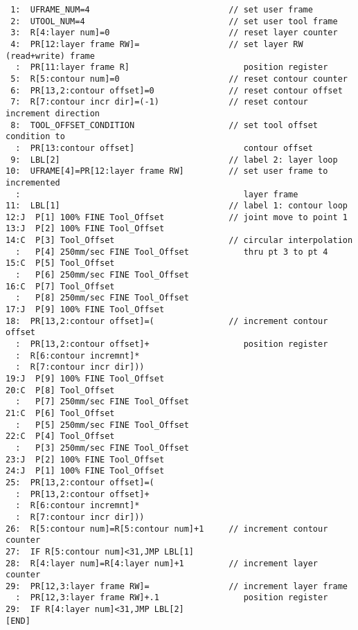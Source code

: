 \begin{verbatim}
 1:  UFRAME_NUM=4                            // set user frame
 2:  UTOOL_NUM=4                             // set user tool frame
 3:  R[4:layer num]=0                        // reset layer counter
 4:  PR[12:layer frame RW]=                  // set layer RW (read+write) frame 
  :  PR[11:layer frame R]                       position register   
 5:  R[5:contour num]=0                      // reset contour counter
 6:  PR[13,2:contour offset]=0               // reset contour offset
 7:  R[7:contour incr dir]=(-1)              // reset contour increment direction
 8:  TOOL_OFFSET_CONDITION                   // set tool offset condition to  
  :  PR[13:contour offset]                      contour offset
 9:  LBL[2]                                  // label 2: layer loop
10:  UFRAME[4]=PR[12:layer frame RW]         // set user frame to incremented 
  :                                             layer frame
11:  LBL[1]                                  // label 1: contour loop
12:J  P[1] 100% FINE Tool_Offset             // joint move to point 1
13:J  P[2] 100% FINE Tool_Offset
14:C  P[3] Tool_Offset                       // circular interpolation 
  :   P[4] 250mm/sec FINE Tool_Offset           thru pt 3 to pt 4
15:C  P[5] Tool_Offset
  :   P[6] 250mm/sec FINE Tool_Offset
16:C  P[7] Tool_Offset
  :   P[8] 250mm/sec FINE Tool_Offset
17:J  P[9] 100% FINE Tool_Offset
18:  PR[13,2:contour offset]=(               // increment contour offset 
  :  PR[13,2:contour offset]+                   position register
  :  R[6:contour incremnt]*
  :  R[7:contour incr dir]))
19:J  P[9] 100% FINE Tool_Offset
20:C  P[8] Tool_Offset
  :   P[7] 250mm/sec FINE Tool_Offset
21:C  P[6] Tool_Offset
  :   P[5] 250mm/sec FINE Tool_Offset
22:C  P[4] Tool_Offset
  :   P[3] 250mm/sec FINE Tool_Offset
23:J  P[2] 100% FINE Tool_Offset
24:J  P[1] 100% FINE Tool_Offset
25:  PR[13,2:contour offset]=(
  :  PR[13,2:contour offset]+
  :  R[6:contour incremnt]*
  :  R[7:contour incr dir]))
26:  R[5:contour num]=R[5:contour num]+1     // increment contour counter
27:  IF R[5:contour num]<31,JMP LBL[1]
28:  R[4:layer num]=R[4:layer num]+1         // increment layer counter
29:  PR[12,3:layer frame RW]=                // increment layer frame 
  :  PR[12,3:layer frame RW]+.1                 position register
29:  IF R[4:layer num]<31,JMP LBL[2]
[END]
\end{verbatim}
